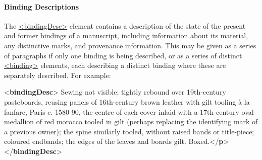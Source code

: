 \paragraph[{Binding Descriptions}]{Binding Descriptions}\label{msphbi}\par
The \hyperref[TEI.bindingDesc]{<bindingDesc>} element contains a description of the state of the present and former bindings of a manuscript, including information about its material, any distinctive marks, and provenance information. This may be given as a series of paragraphs if only one binding is being described, or as a series of distinct \hyperref[TEI.binding]{<binding>} elements, each describing a distinct binding where these are separately described. For example: \par\bgroup{}\exampleFont \begin{shaded}\noindent\mbox{}{<\textbf{bindingDesc}>}\mbox{}\newline 
{}Sewing not visible; tightly rebound over 19th-century pasteboards, reusing\mbox{}\newline 
\hspace*{1em}\hspace*{1em} panels of 16th-century brown leather with gilt tooling à la fanfare, Paris c.\mbox{}\newline 
\hspace*{1em}\hspace*{1em} 1580-90, the centre of each cover inlaid with a 17th-century oval medallion of\mbox{}\newline 
\hspace*{1em}\hspace*{1em} red morocco tooled in gilt (perhaps replacing the identifying mark of a previous\mbox{}\newline 
\hspace*{1em}\hspace*{1em} owner); the spine similarly tooled, without raised bands or title-piece;\mbox{}\newline 
\hspace*{1em}\hspace*{1em} coloured endbands; the edges of the leaves and boards gilt. Boxed.{</\textbf{p}>}\mbox{}\newline 
{</\textbf{bindingDesc}>}\end{shaded}\egroup\par \par
